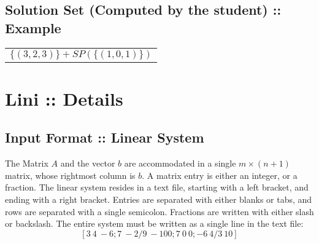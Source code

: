 \documentclass{article}
\begin{document}
\subsection*{Solution Set (Computed by the student) :: Example}
\begin{table}[h]
\centering
\begin{tabular}{ l }
  $\{(3,2,3)\} + SP(\{(1,0,1)\})$ \\
\end{tabular}
\end{table}

\section{Lini :: Details}

\subsection*{Input Format :: Linear System}
The Matrix $A$ and the vector $b$ are accommodated in a single
$m \times (n+1)$ matrix, whose rightmost column is $b$.
A matrix entry is either an integer, or a fraction.
The linear system resides in a text file,
starting with a left bracket, and ending with a right bracket.
Entries are separated with either blanks or tabs, and rows are separated with
a single semicolon. Fractions are written with either slash or backslash.
The entire system must be written as a single line in the text file:\\
\[
[ 3 ~ 4 ~ -6; 7 ~ -2/9 ~ -100; 7 ~ 0 ~ 0; -6 ~ 4/3 ~ 10]
\]
\end{document}
